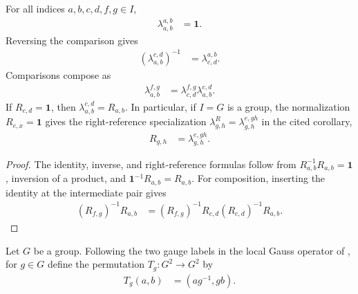 \begin{lemma}
    \label{thm:mpug_unitary_factorization_comparison_laws}
    \leanok
    For all indices $a,b,c,d,f,g\in I$,
    \begin{align}
        \lambda_{a,b}^{a,b} & =\mathbf 1.
    \end{align}
    Reversing the comparison gives
    \begin{align}
        \left(\lambda_{a,b}^{c,d}\right)^{-1}
         & =\lambda_{c,d}^{a,b}.
    \end{align}
    Comparisons compose as
    \begin{align}
        \lambda_{a,b}^{f,g}
         & =\lambda_{c,d}^{f,g}\lambda_{a,b}^{c,d}.
        \label{eq:mpug_unitary_factorization_comparison_laws}
    \end{align}
    If $R_{c,d}=\mathbf 1$, then
    $\lambda_{a,b}^{c,d}=R_{a,b}$. In particular, if $I=G$ is a group, the
    normalization $R_{e,x}=\mathbf 1$ gives the right-reference specialization
    $\lambda^R_{g,h}=\lambda_{g,h}^{e,gh}$ in the cited corollary,
    \begin{align}
        R_{g,h} & =\lambda_{g,h}^{e,gh}.
        \label{eq:mpug_unitary_factorization_right_reference}
    \end{align}
\end{lemma}

\begin{proof}\leanok
    The identity, inverse, and right-reference formulas follow from
    $R_{a,b}^{-1}R_{a,b}=\mathbf 1$, inversion of a product, and
    $\mathbf 1^{-1}R_{a,b}=R_{a,b}$. For composition, inserting the identity at
    the intermediate pair gives
    \begin{align}
        (R_{f,g})^{-1}R_{a,b}
         & =(R_{f,g})^{-1}R_{c,d}(R_{c,d})^{-1}R_{a,b}.
    \end{align}
\end{proof}

\begin{definition}
    \label{def:mpug_gauss_leg_action}
    \leanok
    Let $G$ be a group. Following the two gauge labels in the local Gauss
    operator of \cite[lines~3380--3387]{FrancoRubio2025MPUGauging}, for
    $g\in G$ define the permutation $T_g\colon G^2\to G^2$ by
    \begin{align}
        T_g(a,b) & =\left(ag^{-1},gb\right).
        \label{eq:mpug_gauss_leg_action}
    \end{align}
\end{definition}

